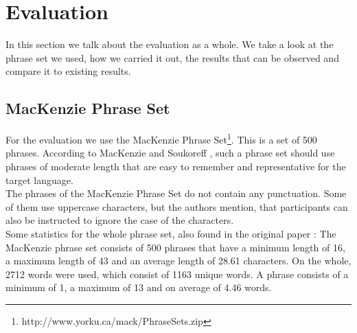 \chapter{Evaluation}

In this section we talk about the evaluation as a whole. We take a look at the phrase set we used, how we carried it out, the results that can be observed and compare it to existing results.

\section{MacKenzie Phrase Set}
For the evaluation we use the MacKenzie Phrase Set\footnote{http://www.yorku.ca/mack/PhraseSets.zip}. This is a set of 500 phrases. According to MacKenzie and Soukoreff \cite{10.1145/765891.765971}, such a phrase set should use phrases of moderate length that are easy to remember and representative for the target language.\\
The phrases of the MacKenzie Phrase Set do not contain any punctuation. Some of them use uppercase characters, but the authors mention, that participants can also be instructed to ignore the case of the characters.\\
Some statistics for the whole phrase set, also found in the original paper \cite{10.1145/765891.765971}: The MacKenzie phrase set consists of 500 phrases that have a minimum length of 16, a maximum length of 43 and an average length of 28.61 characters. On the whole, 2712 words were used, which consist of 1163 unique words. A phrase consists of a minimum of 1, a maximum of 13 and on average of 4.46 words.

